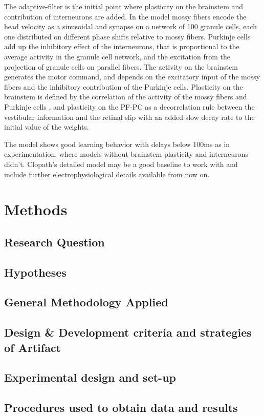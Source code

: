 \documentclass[12pt, a4paper,twoside]{tesi_upf}
\begin{document}
The adaptive-filter is the initial point where plasticity on the brainstem and contribution of interneurons are added. In the model mossy fibers encode the head velocity as a sinusoidal \cite{Manuscript2009} and synapse on a network of 100 granule cells, each one distributed on different phase shifts relative to mossy fibers. Purkinje cells add up the inhibitory effect of the interneurons, that is proportional to the average activity in the granule cell network, and the excitation from the projection of granule cells on parallel fibers. The activity on the brainstem generates the motor command, and depends on the excitatory input of the mossy fibers and the inhibitory contribution of the Purkinje cells. Plasticity on the brainstem is defined by the correlation of the activity of the mossy fibers and Purkinje cells \cite{Menzies2010}, and plasticity on the PF-PC as a decorrelation rule between the vestibular information and the retinal slip \cite{Dean2002} with an added slow decay rate to the initial value of the weights.

The model shows good learning behavior with delays below 100ms as in experimentation, where models without brainstem plasticity and interneurons didn't. Clopath's detailed model may be a good baseline to work with and include further electrophysiological details available from now on.

\chapter{Methods}

\section{Research Question}

\section{Hypotheses}

\section{General Methodology Applied}

\section{Design \& Development criteria and strategies of Artifact}

\section{Experimental design and set-up}

\section{Procedures used to obtain data and results}



\backmatter
\printindex
\end{document}
